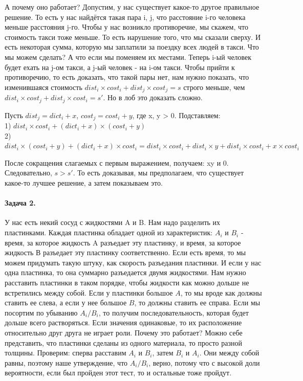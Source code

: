 \documentclass[12pt]{article}
\begin{document}
А почему оно работает? Допустим, у нас существует какое-то другое правильное решение. То есть у нас найдётся такая пара i, j, что расстояние i-го человека меньше расстояния j-го. Чтобы у нас возникло противоречие, мы скажем, что стоимость такси тоже меньше. То есть нарушение того, что мы сказали сверху. И есть некоторая сумма, которую мы заплатили за поездку всех людей в такси. Что мы можем сделать? А что если мы поменяем их местами. Теперь i-ый человек будет ехать на j-ом такси, а j-ый человек - на i-ом такси. Чтобы прийти к противоречию, то есть доказать, что такой пары нет, нам нужно показать, что изменившаяся стоимость $dist_i \times cost_i + dist_j \times cost_j = s$ строго меньше, чем $dist_i \times cost_j + dist_j \times cost_i = s'$. Но в лоб это доказать сложно.

Пусть $dist_j = dict_i + x$, $cost_j = cost_i + y$, где x, y > 0. Подставляем:\\
1) $dist_i \times cost_i + (dict_i + x) \times (cost_i + y)$\\
2) $dist_i \times (cost_i + y) + (dict_i + x) \times cost_i = dist_i \times cost_i + dist_i \times y + dist_i \times cost_i + x \times cost_i$

После сокращения слагаемых с первым выражением, получаем: xy и 0. Следовательно, $s > s'$. То есть доказывая, мы предполагаем, что существует какое-то лучшее решение, а затем показываем это. 

\paragraph{Задача 2.} У нас есть некий сосуд с жидкостями A и B. Нам надо разделить их пластинками. Каждая пластинка обладает одной из характеристик: $A_i$ и $B_i$ - время, за которое жидкость A разъедает эту пластинку, и время, за которое жидкость В разъедает эту пластинку соответственно. Если есть время, то мы можем придумать такую штуку, как скорость разъедания пластинки. И если у нас одна пластинка, то она суммарно разъедается двумя жидкостями. Нам нужно расставить пластинки в таком порядке, чтобы жидкости как можно дольше не встретились между собой. Если у пластинки большое $A$, то мы вроде как должны ставить ее слева, а если у нее большое $B$, то должны ставить ее справа.
Если мы посортим по убыванию $A_i/B_i$, то получим последовательность, которая будет дольше всего растворяться. Если значения одинаковые, то их расположение относительно друг друга не играет роли. Почему это работает? Можно себе представить, что пластинки сделаны из одного материала, то просто разной толщины. Проверим: сперва расставим $A_i$ и $B_i$, затем $B_i$ и $A_i$. Они между собой равны, поэтому наше утверждение, что $A_i/B_i$, верно, потому что с высокой доли вероятности, если был пройден этот тест, то и остальные тоже пройдут.
\end{document}
